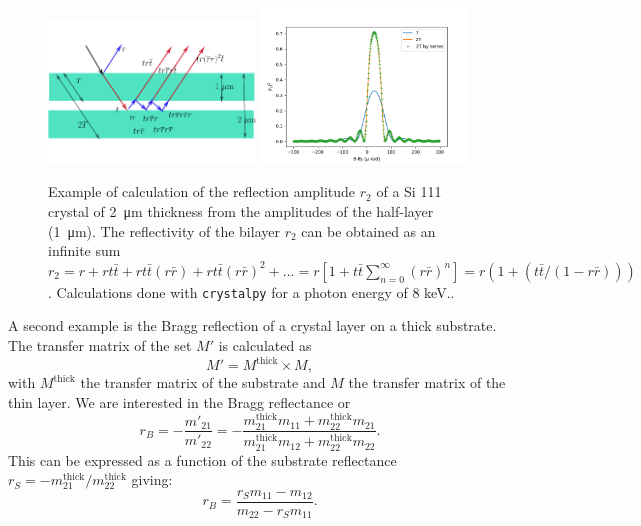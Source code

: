 \documentclass[preprint]{iucr}              %
\begin{document}
\begin{figure}\label{fig:doublelayer}
    \centering
    \includegraphics[width=0.49\textwidth]{figures/figlayered2.pdf}
    \includegraphics[width=0.49\textwidth]{figures/doublelayer2.png}
    \caption{Example of calculation of the reflection amplitude $r_2$ of a Si 111 crystal of \SI{2}{\micro\meter} thickness from the amplitudes of the half-layer (\SI{1}{\micro\meter}). The reflectivity of the bilayer $r_2$ can be obtained as an infinite sum $r_2 = r + r t \bar{t} + r t \bar{t} (r \bar{r}) + r t \bar{t} (r \bar{r})^2 + ...= r[1 + t \bar{t}\sum_{n=0}^{\infty}(r\bar{r})^n]=r(1 + (t \bar{t} / (1-r \bar{r})))$. Calculations done with {\tt crystalpy} for a photon energy of 8 keV..}
\end{figure}


A second example is the Bragg reflection of a crystal layer on a thick substrate. The transfer matrix of the set $M'$ is calculated as
\begin{equation}
    M' = M^{\text{thick}} \times M,
\end{equation}
with $M^{\text{thick}}$ the transfer matrix of the substrate and $M$ the transfer matrix of the thin layer. We are interested in the Bragg reflectance or 
\begin{equation}
r_B=-\frac{m'_{21}}{m'_{22}}=
-\frac{m_{21}^{\text{thick}} m_{11} + m_{22}^{\text{thick}} m_{21}}
{m_{21}^{\text{thick}} m_{12} + m_{22}^{\text{thick}} m_{22}}.
\end{equation}
This can be expressed as a function of the substrate reflectance $r_S=-m_{21}^{\text{thick}}/m_{22}^{\text{thick}}$ giving: 
\begin{equation}
r_B=\frac{r_S m_{11} - m_{12}}
{m_{22}  - r_S m_{11}}.
\end{equation}
\end{document}
